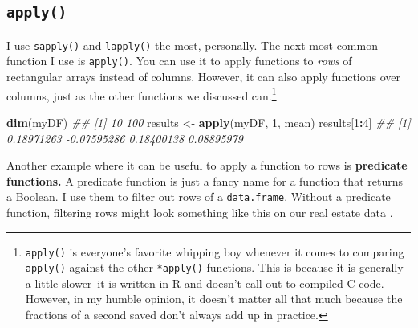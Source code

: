\documentclass[12pt,krantz2]{krantz}
\makeatletter
\newenvironment{Shaded}{\begin{snugshade}}{\end{snugshade}}
\newcommand{\CommentTok}[1]{\textcolor[rgb]{0.37,0.37,0.37}{\textit{#1}}}
\newcommand{\DecValTok}[1]{\textcolor[rgb]{0.06,0.06,0.06}{#1}}
\newcommand{\KeywordTok}[1]{\textcolor[rgb]{0.27,0.27,0.27}{\textbf{#1}}}
\newcommand{\NormalTok}[1]{#1}
\newcommand{\OperatorTok}[1]{\textcolor[rgb]{0.43,0.43,0.43}{\textbf{#1}}}
\newcommand{\StringTok}[1]{\textcolor[rgb]{0.5,0.5,0.5}{#1}}
\newenvironment{kframe}{%
\medskip{}
\setlength{\fboxsep}{.8em}
 \def\at@end@of@kframe{}%
 \ifinner\ifhmode%
  \def\at@end@of@kframe{\end{minipage}}%
  \begin{minipage}{\columnwidth}%
 \fi\fi%
 \def\FrameCommand##1{\hskip\@totalleftmargin \hskip-\fboxsep
 \colorbox{shadecolor}{##1}\hskip-\fboxsep
     \hskip-\linewidth \hskip-\@totalleftmargin \hskip\columnwidth}%
 \MakeFramed {\advance\hsize-\width
   \@totalleftmargin\z@ \linewidth\hsize
   \@setminipage}}%
 {\par\unskip\endMakeFramed%
 \at@end@of@kframe}
\renewenvironment{Shaded}{\begin{kframe}}{\end{kframe}}
\makeatother
\begin{document}
\hypertarget{apply}{%
\subsection{\texorpdfstring{\texttt{apply()}}{apply()}}\label{apply}}

I use \texttt{sapply()} and \texttt{lapply()} the most, personally. The next most common function I use is \texttt{apply()}. You can use it to apply functions to \emph{rows} of rectangular arrays instead of columns. However, it can also apply functions over columns, just as the other functions we discussed can.\footnote{\texttt{apply()} is everyone's favorite whipping boy whenever it comes to comparing \texttt{apply()} against the other \texttt{*apply()} functions. This is because it is generally a little slower--it is written in R and doesn't call out to compiled C code. However, in my humble opinion, it doesn't matter all that much because the fractions of a second saved don't always add up in practice. }

\begin{Shaded}
\begin{Highlighting}[]
\KeywordTok{dim}\NormalTok{(myDF)}
\CommentTok{## [1]  10 100}
\NormalTok{results <-}\StringTok{ }\KeywordTok{apply}\NormalTok{(myDF, }\DecValTok{1}\NormalTok{, mean)}
\NormalTok{results[}\DecValTok{1}\OperatorTok{:}\DecValTok{4}\NormalTok{]}
\CommentTok{## [1]  0.18971263 -0.07595286  0.18400138  0.08895979}
\end{Highlighting}
\end{Shaded}

Another example where it can be useful to apply a function to rows is \textbf{predicate functions.} A predicate function is just a fancy name for a function that returns a Boolean. I use them to filter out rows of a \texttt{data.frame}. Without a predicate function, filtering rows might look something like this on our real estate data \citep{albemarle_county_gis_web} \citep{clay_ford}.
\end{document}
